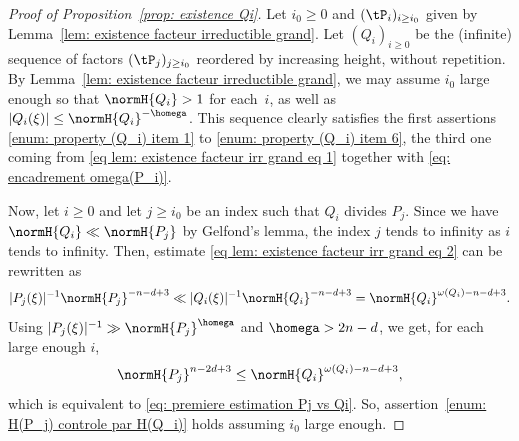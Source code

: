 \begin{proof}[Proof of Proposition~\ref{prop: existence Qi}]
Let $i_0\geq 0$ and $(\tP_i)_{i\geq i_0}$ given by Lemma~\ref{lem: existence facteur irreductible grand}. Let $(Q_i)_{i\geq 0}$ be the (infinite) sequence of factors $(\tP_j)_{j\geq i_0}$ reordered by increasing height, without repetition. By Lemma~\ref{lem: existence facteur irreductible grand}, we may assume $i_0$ large enough so that $\normH{Q_i} > 1$ for each~$i$, as well as $|Q_i(\xi)| \leq \normH{Q_i}^{-\homega}$. This sequence clearly satisfies the first assertions \eqref{enum: property (Q_i) item 1} to \eqref{enum: property (Q_i) item 6}, the third one coming from \eqref{eq lem: existence facteur irr grand eq 1} together with \eqref{eq: encadrement omega(P_i)}.

Now, let $i\geq 0$ and let $j\geq i_0$ be an index such that $Q_i$ divides $P_j$. Since we have $\normH{Q_i}\ll \normH{P_j}$ by Gelfond's lemma, the index $j$ tends to infinity as $i$ tends to infinity. Then, estimate \eqref{eq lem: existence facteur irr grand eq 2} can be rewritten as
\begin{equation}
\label{eq proof: inter 1 pour controler H(P_j)}
|P_j(\xi)|^{-1}\normH{P_j}^{-n-d+3} \ll |Q_i(\xi)|^{-1}\normH{Q_i}^{-n-d+3} = \normH{Q_i}^{\omega(Q_i)-n-d+3}.
\end{equation}
Using $|P_j(\xi)|^{-1} \gg \normH{P_j}^{\homega}$ and $\homega > 2n-d$, we get, for each large enough $i$,
\begin{equation*}
\normH{P_j}^{n-2d+3} \leq \normH{Q_i}^{\omega(Q_i)-n-d+3},
\end{equation*}
which is equivalent to \eqref{eq: premiere estimation Pj vs Qi}. So, assertion~\eqref{enum: H(P_j) controle par H(Q_i)} holds assuming $i_0$ large enough.


\end{proof}
